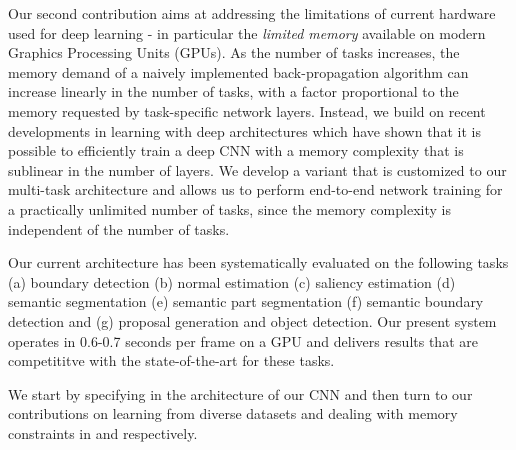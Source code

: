 \documentclass[10pt,twocolumn,letterpaper]{article}
\begin{document}

Our second contribution aims at addressing the limitations of current hardware used for deep learning - in particular the {\em limited memory} available on modern Graphics Processing Units (GPUs).
As the number of tasks increases, the memory demand of a naively implemented back-propagation algorithm can increase linearly in the number of tasks, with a factor proportional to the memory requested by  task-specific network layers. Instead, we build on recent developments in  learning with deep architectures \cite{GruslysMDLG16,ChenXZG16} which have shown that it is possible to efficiently train a deep CNN with a  memory complexity that is sublinear in the number of layers. We develop a variant that is customized to our multi-task architecture and allows us to perform end-to-end network training for a practically unlimited number of tasks, since the memory complexity is independent of the number of tasks. 

Our current architecture has been systematically evaluated on the following tasks (a) boundary detection (b) normal estimation (c) saliency estimation (d) semantic segmentation (e) semantic part segmentation (f) semantic boundary detection 
and (g) proposal generation and object detection.
Our present system operates in 0.6-0.7 seconds per frame on a GPU and delivers  results that are competititve with the state-of-the-art for these tasks.
  


We start by specifying in  the architecture of our CNN and then turn to our contributions on learning from diverse datasets  and dealing with memory constraints in   and  respectively. 

\end{document}

